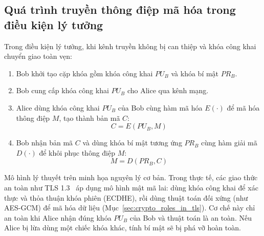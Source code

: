 \subsection{Quá trình truyền thông điệp mã hóa trong điều kiện lý tưởng}
Trong điều kiện lý tưởng, khi kênh truyền không bị can thiệp và khóa công khai chuyển giao toàn vẹn:
\begin{enumerate}
    \item Bob khởi tạo cặp khóa gồm khóa công khai $PU_B$ và khóa bí mật $PR_B$.
    \item Bob cung cấp khóa công khai $PU_B$ cho Alice qua kênh mạng.
    \item Alice dùng khóa công khai $PU_B$ của Bob cùng hàm mã hóa $E(\cdot)$ để mã hóa thông điệp $M$, tạo thành bản mã $C$:
    \begin{equation}
        C = E(PU_B, M)
    \end{equation}
    \item Bob nhận bản mã $C$ và dùng khóa bí mật tương ứng $PR_B$ cùng hàm giải mã $D(\cdot)$ để khôi phục thông điệp $M$:
    \begin{equation}
        M = D(PR_B, C)
    \end{equation}
\end{enumerate}

Mô hình lý thuyết trên minh họa nguyên lý cơ bản. Trong thực tế, các giao thức an toàn như TLS 1.3~\cite{rfc8446} áp dụng mô hình mật mã lai: dùng khóa công khai để xác thực và thỏa thuận khóa phiên (ECDHE), rồi dùng thuật toán đối xứng (như AES-GCM) để mã hóa dữ liệu (Mục~\ref{sec:crypto_roles_in_tls}). Cơ chế này chỉ an toàn khi Alice nhận đúng khóa $PU_B$ của Bob và thuật toán là an toàn. Nếu Alice bị lừa dùng một chiếc khóa khác, tính bí mật sẽ bị phá vỡ hoàn toàn.

